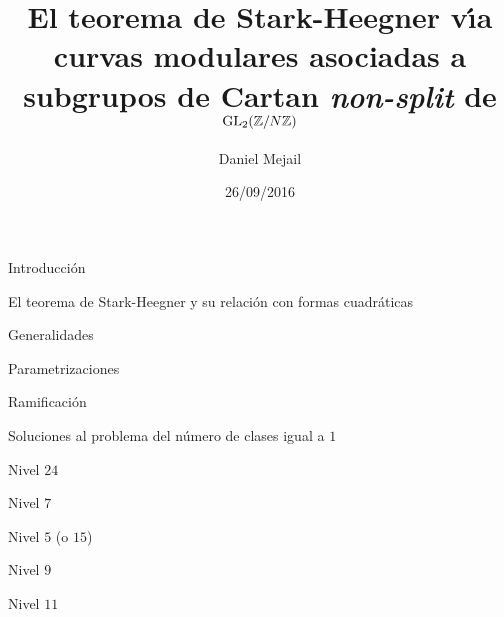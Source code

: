 \documentclass[a4paper,12pt]{article}
\title{El teorema de Stark-Heegner v\'{\i}a curvas modulares %
	asociadas a subgrupos de Cartan \textit{non-split} %
	de $\mathrm{GL}_{2}(\mathbb{Z}/N\mathbb{Z})$}
\author{Daniel Mejail}
\date{26/09/2016}
\begin{document}
\maketitle
\begin{section}{Introducci\'{o}n}\label{sec:intro}
 

 \begin{subsection}{El teorema de Stark-Heegner %
			y su relaci\'{o}n con formas %
			cuadr\'{a}ticas}\label{subsec:losNueve}
 \end{subsection}
\end{section}

\begin{section}{Generalidades}%
 \label{sec:generalidades}
 

 \begin{subsection}{Parametrizaciones}\label{subsec:params}
  
 \end{subsection}

 \begin{subsection}{Ramificaci\'{o}n}\label{subsec:ram}
  
 \end{subsection}
\end{section}
 
\begin{section}{Soluciones al problema del n\'{u}mero de %
		clases igual a $1$}\label{sec:soluciones}
 \begin{subsection}{Nivel $24$}\label{subsec:nivelVeinticuatro}
  
 \end{subsection}

 \begin{subsection}{Nivel $7$}\label{subsec:nivelSiete}
  
 \end{subsection}

 \begin{subsection}{Nivel $5$ (o $15$)}\label{subsec:nivelCinco}
  
 \end{subsection}

 \begin{subsection}{Nivel $9$}\label{subsec:nivelNueve}
  
 \end{subsection}

 \begin{subsection}{Nivel $11$}\label{subsec:nivelOnce}
  
 \end{subsection}
\end{section}
\end{document}
